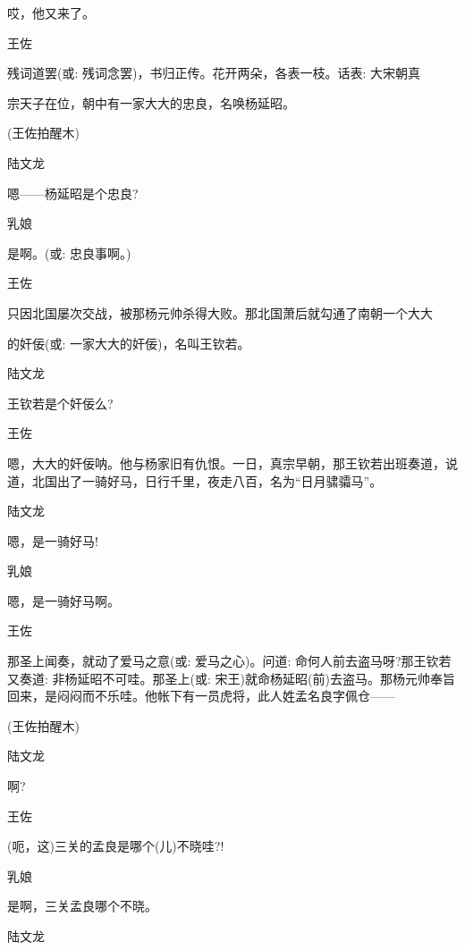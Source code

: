 {{{哎，他又来了。}

{王佐

残词道罢({\akai 或}: 残词念罢)，书归正传。花开两朵，各表一枝。话表: 大宋朝真

宗天子在位，朝中有一家大大的忠良，名唤杨延昭。}

{(王佐拍醒木)}

{陆文龙\hspace{20pt}~

嗯------杨延昭是个忠良?}

{乳娘\hspace{30pt}~

是啊。({\akai 或}: 忠良事啊。)}

{王佐

只因北国屡次交战，被那杨元帅杀得大败。那北国萧后就勾通了南朝一个大大

的奸佞({\akai 或}: 一家大大的奸佞)，名叫王钦若。}

{陆文龙\hspace{20pt}~

王钦若是个奸佞么?}

{王佐

嗯，大大的奸佞呐。他与杨家旧有仇恨。一日，真宗早朝，那王钦若出班奏道，说道，北国出了一骑好马，日行千里，夜走八百，名为``日月骕骦马''。}

{陆文龙\hspace{20pt}~

嗯，是一骑好马!}

{乳娘\hspace{30pt}~

嗯，是一骑好马啊。}

{王佐

那圣上闻奏，就动了爱马之意({\akai 或}: 爱马之心)。问道: 命何人前去盗马呀?那王钦若又奏道: 非杨延昭不可哇。那圣上({\akai 或}: 宋王)就命杨延昭(前)去盗马。那杨元帅奉旨回来，是闷闷而不乐哇。他帐下有一员虎将，此人姓孟名良字佩仓------}

{(王佐拍醒木)}

{陆文龙\hspace{20pt}~

啊?}

{王佐\hspace{30pt}~

(呃，这)三关的孟良是哪个(儿)不晓哇?!}

{乳娘\hspace{30pt}~

是啊，三关孟良哪个不晓。}

{陆文龙\hspace{20pt}~

}}}
